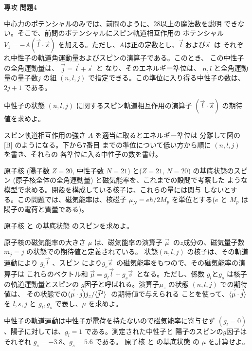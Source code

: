 \documentclass[fleqn]{jbook}
\begin{document}
\begin{question}{専攻 問題4}{}
\begin{subquestions}
\SubQuestion
  中心力のポテンシャルのみでは、前問のように、28以上の魔法数を説明
  できない。そこで、前問のポテンシャルにスピン軌道相互作用の
  ポテンシャル$V_1 = -A(\Vec{l}\cdot\Vec{s})$
  を加える。ただし、$A$は正の定数とし、$\Vec{l}\ $および$\Vec{s}\ $ は
  それぞれ中性子の軌道角運動量およびスピンの演算子である。このとき、
  この中性子の全角運動量は、 $\Vec{j} = \Vec{l} + \Vec{s}\ $ と
  なり、そのエネルギー準位は、 $n,l$ と全角運動量の量子数$j$ の組
  $(n,l,j)$ で指定できる。この準位に入り得る中性子の数は、 $2j+1$
  である。

  \begin{subsubquestions}
  \SubSubQuestion
    中性子の状態 $(n,l,j)$ に関するスピン軌道相互作用の演算子 
    $(\Vec{l}\cdot\Vec{s})$ の期待値を求めよ。

  \SubSubQuestion
    スピン軌道相互作用の強さ $A$ を適当に取るとエネルギー準位は
    分離して図の [B] のようになる。下から7番目
    までの準位について低い方から順に $(n,l,j)$ を書き、それらの
    各準位に入る中性子の数を書け。
  \end{subsubquestions}

\SubQuestion
  原子核 \Ca(陽子数 $Z = 20$, 中性子数 $N = 21$) 
  と\Sc($Z = 21$, $N = 20$) の基底状態のスピン 
  (原子核全体の全角運動量) と磁気能率を、これまでの設問で考察した
  ような模型で求める。閉殻を構成している核子は、これらの量には関与
  しないとする。この問題では、磁気能率は、核磁子 $\mu_N=e\hbar/2M_p$
  を単位とする($e$ と $M_p$ は陽子の電荷と質量である)。

  \begin{subsubquestions}
  \SubSubQuestion
    原子核 \Ca と \Sc の基底状態
    のスピンを求めよ。

  \SubSubQuestion
    原子核の磁気能率の大きさ $\mu$ は、磁気能率の演算子 $\Vec{\mu}\ $
    の$z$成分の、磁気量子数 $m_j=j$ の状態での期待値と定義されている。
    状態$(n,l,j)$ の核子は、その軌道運動により $g_l\Vec{l}$ 、スピン
    により$g_s\Vec{s}\ $ の磁気能率をもつので、その磁気能率の演算子は
    これらのベクトル和%
    $\Vec{\mu}=g_l\Vec{l}+g_s\Vec{s}\ $
    となる。ただし、係数 $g_l$と$g_s$ は核子の軌道運動量とスピンの
    $g$因子と呼ばれる。演算子$\mu_z$ の状態 $(n,l,j)$ での期待値は、
    その状態での$(\Vec{\mu}\cdot\Vec{j})j_z/\Mean{\vec{j}^2}\ $ の期待値で与えられる
    ことを使って、$\langle{\vec{\mathstrut \mu}\cdot\vec{\mathstrut j}}\rangle$ を $l,s,j$ と
    $g_l,g_s$ で表し、$\mu$ を求めよ。

  \SubSubQuestion
    中性子の軌道運動は中性子が電荷を持たないので磁気能率に寄与せず
    $(g_l=0)$、陽子に対しては、$g_l=1$ である。測定された中性子と
    陽子のスピンの$g$因子はそれぞれ $g_s = -3.8$、$g_s = 5.6$ である。
    原子核 \Ca と \Sc の基底状態
    の $\mu$ を計算せよ。

  \end{subsubquestions}
\end{subquestions}
\end{question}
\end{document}
